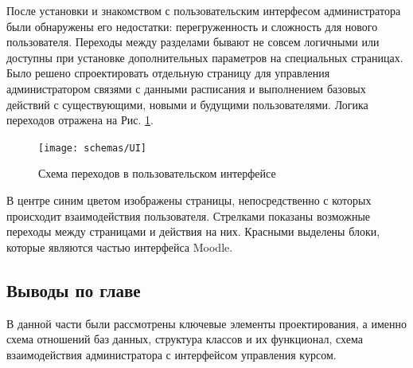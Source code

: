 \documentclass[a4paper,14pt]{article}
\begin{document}
После установки и знакомством с пользовательским интерфесом администратора были обнаружены его недостатки: перегруженность и сложность для нового пользователя.
Переходы между разделами бывают не совсем логичными или доступны при установке дополнительных параметров на специальных страницах.
Было решено спроектировать отдельную страницу для управления администратором связями с данными расписания и выполнением базовых действий с существующими, новыми и будущими пользователями.
Логика переходов отражена на Рис. \ref{img:UI}.

\begin{figure}[H]
	\centering		
	\texttt{[image: schemas/UI]}
	\caption{Схема переходов в пользовательском интерфейсе}\label{img:UI}
\end{figure}

В центре синим цветом изображены страницы, непосредственно с которых происходит взаимодействия пользователя.
Стрелками показаны возможные переходы между страницами и действия на них.
Красными выделены блоки, которые являются частью интерфейса Moodle.






\subsection{Выводы по главе}

В данной части были рассмотрены ключевые элементы проектирования, а именно схема отношений баз данных, структура классов и их функционал, схема взаимодействия администратора с интерфейсом управления курсом.















\end{document}
